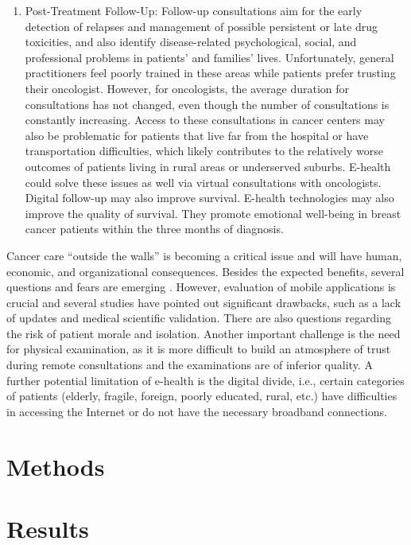 \begin{enumerate}
    \item Post-Treatment Follow-Up: Follow-up consultations aim for the early detection of relapses and management of possible persistent or late drug toxicities, and also identify disease-related psychological, social, and professional problems in patients' and families' lives. Unfortunately, general practitioners feel poorly trained in these areas while patients prefer trusting their oncologist. However, for oncologists, the average duration for consultations has not changed, even though the number of consultations is constantly increasing. Access to these consultations in cancer centers may also be problematic for patients that live far from the hospital or have transportation difficulties, which likely contributes to the relatively worse outcomes of patients living in rural areas or underserved suburbs. E-health could solve these issues as well via virtual consultations with oncologists. Digital follow-up may also improve survival. E-health technologies may also improve the quality of survival. They promote emotional well-being in breast cancer patients within the three months of diagnosis.
\end{enumerate}

Cancer care ``outside the walls'' is becoming a critical issue and will have human, economic, and organizational consequences. Besides the expected benefits, several questions and fears are emerging \cite{bertucci_outpatient_2019}. However, evaluation of mobile applications is crucial and several studies have pointed out significant drawbacks, such as a lack of updates and medical scientific validation. There are also questions regarding the risk of patient morale and isolation. Another important challenge is the need for physical examination, as it is more difficult to build an atmosphere of trust during remote consultations and the examinations are of inferior quality. A further potential limitation of e-health is the digital divide, i.e., certain categories of patients (elderly, fragile, foreign, poorly educated, rural, etc.) have difficulties in accessing the Internet or do not have the necessary broadband connections.

\section{Methods}

\section{Results}


